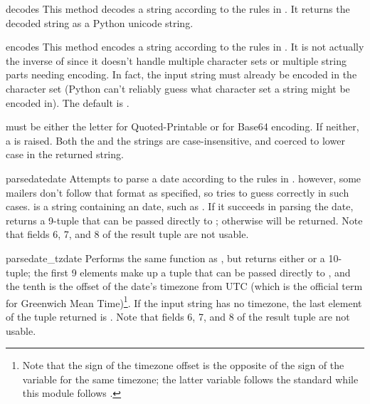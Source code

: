 \begin{funcdesc}{decode}{s}
This method decodes a string according to the rules in .  It
returns the decoded string as a Python unicode string.
\end{funcdesc}

\begin{funcdesc}{encode}{s}
This method encodes a string according to the rules in .  It
is not actually the inverse of  since it doesn't
handle multiple character sets or multiple string parts needing
encoding.  In fact, the input string  must already be encoded
in the  character set (Python can't reliably guess what
character set a string might be encoded in).  The default
 is .

 must be either the letter  for
Quoted-Printable or  for Base64 encoding.  If
neither, a  is raised.  Both the  and
the  strings are case-insensitive, and coerced to lower
case in the returned string.
\end{funcdesc}

\begin{funcdesc}{parsedate}{date}
Attempts to parse a date according to the rules in .
however, some mailers don't follow that format as specified, so
 tries to guess correctly in such cases. 
 is a string containing an  date, such as 
.  If it succeeds in parsing
the date,  returns a 9-tuple that can be passed
directly to ; otherwise  will be
returned.  Note that fields 6, 7, and 8 of the result tuple are not
usable.
\end{funcdesc}

\begin{funcdesc}{parsedate_tz}{date}
Performs the same function as , but returns
either  or a 10-tuple; the first 9 elements make up a tuple
that can be passed directly to , and the tenth
is the offset of the date's timezone from UTC (which is the official
term for Greenwich Mean Time)\footnote{Note that the sign of the timezone
offset is the opposite of the sign of the 
variable for the same timezone; the latter variable follows the
\POSIX{} standard while this module follows .}.  If the input
string has no timezone, the last element of the tuple returned is
.  Note that fields 6, 7, and 8 of the result tuple are not
usable.
\end{funcdesc}

